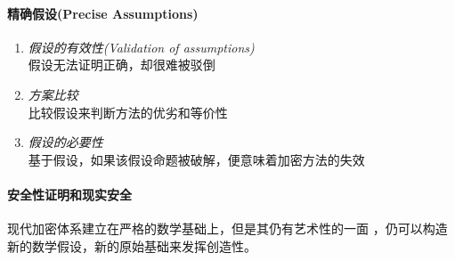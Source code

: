 \documentclass{article}
\begin{document}
	\paragraph{精确假设(Precise Assumptions)}
	\begin{enumerate}
		\item \textit{假设的有效性(Validation of assumptions)}
		\\假设无法证明正确，却很难被驳倒
		\item \textit{方案比较}
		\\ 比较假设来判断方法的优劣和等价性
		\item \textit{假设的必要性}
		\\ 基于假设，如果该假设命题被破解，便意味着加密方法的失效
	\end{enumerate}
	\paragraph{安全性证明和现实安全}
	\par\indent
	现代加密体系建立在严格的数学基础上，但是其仍有艺术性的一面
	，仍可以构造新的数学假设，新的原始基础来发挥创造性。
	\begin{comment}
		\section{完善保密}
		
		\subsection{香农}
		\begin{enumerate}
			\item 评价安全体，计算安全性
			\item 混乱扩散
			\item 乘积密码体制
		\end{enumerate}
		$P\left[x|y\right] = P\left[x\right]$\\
		左边后验，右边先验
		贝叶斯公式
		\begin{equation}
			P[x|y] =\frac{P[y|x]P[x]}{P[y]}
		\end{equation}
		一次一密
	\end{comment}
\end{document}
